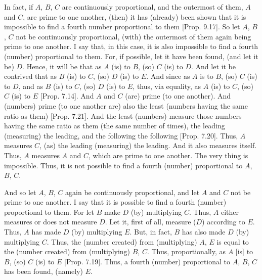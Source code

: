 \begin{Parallel}{}{}
{In fact, if $A$, $B$, $C$ are continuously proportional, and the outermost
of them, $A$ and $C$, are prime to one another, (then) it has (already) been shown that it is impossible to find a fourth number proportional to them
[Prop. 9.17]. So let $A$, $B$, $C$
not be continuously proportional, (with) the outermost of them again being
prime to one another. I say that, in this case, it is also impossible to find a fourth (number)
proportional to them. For, if possible, let it have been found,
(and let it be) $D$. Hence, it will be that as $A$ (is) to $B$, (so)
$C$ (is) to $D$. And let it be contrived that as $B$ (is) to $C$, (so) $D$ (is) to $E$. And since as $A$ is to $B$, (so) $C$ (is) to $D$, and as $B$ (is) to $C$, (so)
$D$ (is) to $E$, thus, via equality, as $A$ (is) to $C$, (so) $C$ (is) to $E$
[Prop. 7.14]. And $A$ and $C$ (are) prime (to one another). And (numbers) prime (to one another are) also the least (numbers
having the same ratio as them) [Prop. 7.21]. 
And the least (numbers) measure those numbers having the same ratio
as them (the same number of times), the leading (measuring) the leading,
and the following the following [Prop. 7.20]. 
Thus, $A$ measures $C$, (as) the leading (measuring) the leading.
And it also measures itself. Thus, $A$ measures $A$ and $C$, which are
prime to one another. The very thing is impossible. Thus, it is not possible to find a fourth (number) proportional to $A$, $B$, $C$.

And so let $A$, $B$, $C$  again be continuously proportional, and let $A$ and $C$ not be prime to one another. I say that it is possible to find
a fourth (number) proportional to them. For let $B$ make $D$ (by) multiplying $C$. Thus, $A$ either measures or does not measure $D$. 
Let it, first of all, measure ($D$) according to $E$. Thus, $A$ has made $D$ (by) multiplying $E$. But, in fact, $B$ has also made $D$ (by) multiplying $C$. Thus, the (number created) from (multiplying) $A$, $E$
is equal to the (number created) from (multiplying) $B$, $C$. Thus, 
proportionally, as $A$ [is] to $B$, (so) $C$ (is) to $E$ [Prop. 7.19]. Thus, a fourth (number) proportional
to $A$, $B$, $C$ has been found, (namely) $E$.

}
\end{Parallel}
